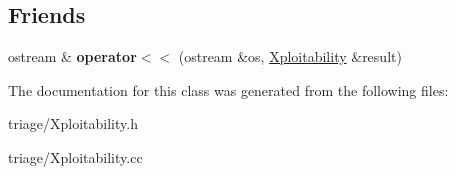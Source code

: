 \subsection*{Friends}
\begin{DoxyCompactItemize}
\item 
\mbox{\label{classsl2_1_1_xploitability_ae2b155e828159f6727c2f84ede68f2c2}} 
ostream \& {\bfseries operator$<$$<$} (ostream \&os, \mbox{\hyperlink{classsl2_1_1_xploitability}{Xploitability}} \&result)
\end{DoxyCompactItemize}


The documentation for this class was generated from the following files\+:\begin{DoxyCompactItemize}
\item 
triage/Xploitability.\+h\item 
triage/Xploitability.\+cc\end{DoxyCompactItemize}
